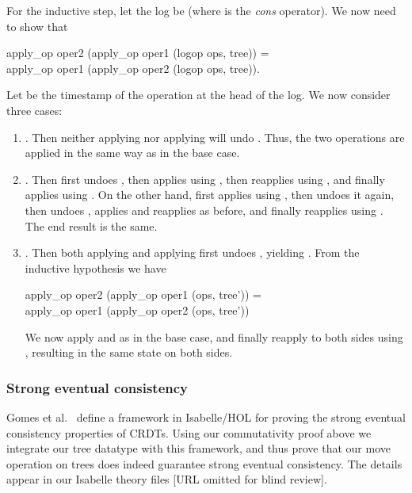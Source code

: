 \documentclass[sigplan,anonymous]{acmart}
\renewenvironment{isabelle}{%
  \medbreak\noindent%
  \renewcommand{\isanewline}{\\}%
  \begin{minipage}{\columnwidth}%
  \begin{isabellebody}%
  \begin{tabbing}%
}{%
  \end{tabbing}%
  \end{isabellebody}%
  \end{minipage}%
  \medbreak%
}
\begin{document}
For the inductive step, let the log be  (where \isa{\isacharhash} is the \emph{cons} operator).
We now need to show that
\begin{isabelle}
apply\_op oper2 (apply\_op oper1 (logop {\isacharhash} ops, tree)) =\\
apply\_op oper1 (apply\_op oper2 (logop {\isacharhash} ops, tree)).
\end{isabelle}
Let  be the timestamp of the operation at the head of the log.
We now consider three cases:
\begin{enumerate}
    \item {}.
        Then neither applying  nor applying  will undo .
        Thus, the two operations are applied in the same way as in the base case.
    \item {}.
        Then  first undoes , then applies  using , then reapplies  using , and finally applies  using .
        On the other hand,  first applies  using , then undoes it again, then undoes , applies  and reapplies  as before, and finally reapplies  using .
        The end result is the same.
    \item {}.
        Then both applying  and applying  first undoes , yielding .
        From the inductive hypothesis we have
        \begin{isabelle}
        apply\_op oper2 (apply\_op oper1 (ops, tree')) =\\
        apply\_op oper1 (apply\_op oper2 (ops, tree'))
        \end{isabelle}
        We now apply  and  as in the base case, and finally reapply  to both sides using , resulting in the same state on both sides.
\end{enumerate}

\subsubsection{Strong eventual consistency}

Gomes et al.~\cite{Gomes:2017gy} define a framework in Isabelle/HOL for proving the strong eventual consistency properties of CRDTs.
Using our commutativity proof above we integrate our tree datatype with this framework, and thus prove that our move operation on trees does indeed guarantee strong eventual consistency.
The details appear in our Isabelle theory files [URL omitted for blind review]. %
\end{document}
